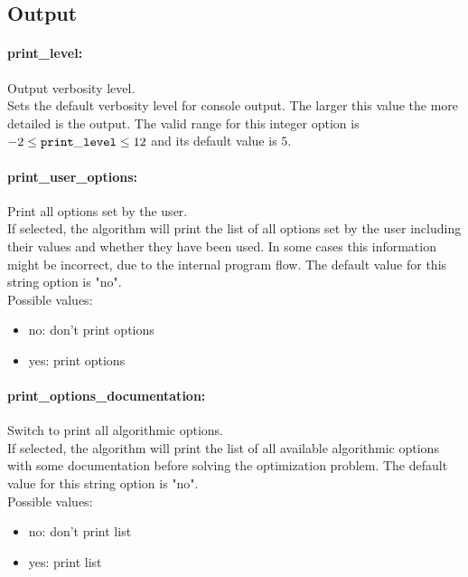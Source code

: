 
\subsection{Output}

\paragraph{print\_level:}\label{sec:print_level} Output verbosity level. $\;$ \\
 Sets the default verbosity level for console
output. The larger this value the more detailed
is the output. The valid range for this integer option is
$-2 \le {\tt print\_level } \le 12$
and its default value is $5$.


\paragraph{print\_user\_options:}\label{sec:print_user_options} Print all options set by the user. $\;$ \\
 If selected, the algorithm will print the list of
all options set by the user including their
values and whether they have been used.  In some
cases this information might be incorrect, due to
the internal program flow.
The default value for this string option is "no".
\\ 
Possible values:
\begin{itemize}
   \item no: don't print options
   \item yes: print options
\end{itemize}

\paragraph{print\_options\_documentation:}\label{sec:print_options_documentation} Switch to print all algorithmic options. $\;$ \\
 If selected, the algorithm will print the list of
all available algorithmic options with some
documentation before solving the optimization
problem.
The default value for this string option is "no".
\\ 
Possible values:
\begin{itemize}
   \item no: don't print list
   \item yes: print list
\end{itemize}

